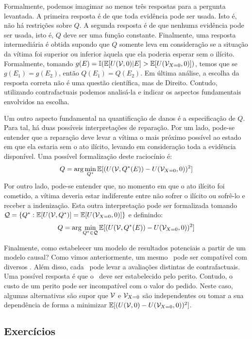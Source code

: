 Formalmente, podemos imagimar 
ao menos três respostas para a pergunta levantada.
A primeira resposta é de que toda evidência pode ser usada.
Isto é, não há restrições sobre $Q$.
A segunda resposta é de que nenhuma evidência pode ser usada,
isto é, $Q$ deve ser uma função constante.
Finalmente, uma resposta intermediária é obtida supondo que
$Q$ somente leva em consideração se a situação 
da vítima foi superior ou inferior àquela que
ela poderia esperar sem o ilícito.
Formalmente, tomando
$g(E) = {\mathbb I}({\mathbb E}[U({\mathcal V},0)|E] > {\mathbb E}[U({\mathcal V}_{X=0},0)])$,
temos que se $g(E_1) = g(E_2)$, então
$Q(E_1) = Q(E_2)$.
Em última análise, a escolha da resposta correta
não é uma questão científica, mas de Direito.
Contudo, utilizando contrafactuais podemos
analisá-la e indicar os aspectos fundamentais
envolvidos na escolha.

Um outro aspecto fundamental 
na quantificação de danos é a especificação de $Q$.
Para tal, há duas possíveis interpretações de reparação.
Por um lado, pode-se entender que
a reparação deve levar a vítima o mais próximo possível
ao estado em que ela estaria sem o ato ilícito,
levando em consideração toda a evidência disponível.
Uma possível formalização deste raciocínio é:
\begin{align*}
 Q = \arg\min_{Q^*}{\mathbb E}[(U({\mathcal V},Q^*(E)) - U({\mathcal V}_{X=0},0))^2]
\end{align*}
Por outro lado, pode-se entender que,
no momento em que o ato ilícito foi cometido,
a vítima deveria estar indiferente entre
não sofrer o ilícito ou sofrê-lo e receber a indenização.
Esta outra interpretação pode ser formalizada 
tomando $\mathcal{Q} = \{Q^*: {\mathbb E}[U({\mathcal V},Q^*)] = {\mathbb E}[U({\mathcal V}_{X=0},0)]\}$
e definindo:
\begin{align*}
 Q = \arg\min_{Q^* \in \mathcal{Q}}{\mathbb E}[(U({\mathcal V},Q^*(E)) - U({\mathcal V}_{X=0},0))^2]
\end{align*}

Finalmente, como estabelecer 
um modelo de resultados potenciais 
a partir de um modelo causal?
Como vimos anteriormente, 
um mesmo \CM \ pode ser compatível com
diversos \SCM. Além disso,
cada \SCM \ pode levar a avaliações
distintas de contrafactuais.
Uma possível resposta é que
o \SCM \ deve ser estabelecido pelo perito.
Contudo, o custo de um perito pode ser
incompatível com o valor do pedido.
Neste caso, algumas alternativas são supor que
${\mathcal V}$ e ${\mathcal V}_{X=0}$ são independentes ou
tomar a sua dependência de forma a minimizar
${\mathbb E}[(U({\mathcal V},0)-U({\mathcal V}_{X=0},0))^2]$.

\subsection{Exercícios}

